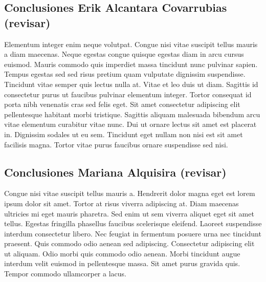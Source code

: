 	\subsection{Conclusiones Erik Alcantara Covarrubias (revisar)}
	Elementum integer enim neque volutpat. Congue nisi vitae suscipit tellus mauris a diam maecenas. Neque egestas congue quisque egestas diam in arcu cursus euismod. Mauris commodo quis imperdiet massa tincidunt nunc pulvinar sapien. Tempus egestas sed sed risus pretium quam vulputate dignissim suspendisse. Tincidunt vitae semper quis lectus nulla at. Vitae et leo duis ut diam. Sagittis id consectetur purus ut faucibus pulvinar elementum integer. Tortor consequat id porta nibh venenatis cras sed felis eget. Sit amet consectetur adipiscing elit pellentesque habitant morbi tristique. Sagittis aliquam malesuada bibendum arcu vitae elementum curabitur vitae nunc. Dui ut ornare lectus sit amet est placerat in. Dignissim sodales ut eu sem. Tincidunt eget nullam non nisi est sit amet facilisis magna. Tortor vitae purus faucibus ornare suspendisse sed nisi.
	\subsection{Conclusiones Mariana Alquisira (revisar)}
	Congue nisi vitae suscipit tellus mauris a. Hendrerit dolor magna eget est lorem ipsum dolor sit amet. Tortor at risus viverra adipiscing at. Diam maecenas ultricies mi eget mauris pharetra. Sed enim ut sem viverra aliquet eget sit amet tellus. Egestas fringilla phasellus faucibus scelerisque eleifend. Laoreet suspendisse interdum consectetur libero. Nec feugiat in fermentum posuere urna nec tincidunt praesent. Quis commodo odio aenean sed adipiscing. Consectetur adipiscing elit ut aliquam. Odio morbi quis commodo odio aenean. Morbi tincidunt augue interdum velit euismod in pellentesque massa. Sit amet purus gravida quis. Tempor commodo ullamcorper a lacus.
